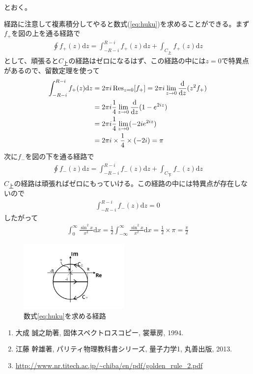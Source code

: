 \documentclass[11pt,b5paper,papersize,dvipdfmx]{jsbook}
\begin{document}
とおく。\par
経路に注意して複素積分してやると数式(\ref{eq:huku})を求めることができる。まず$f_+$を図の上を通る経路で
\begin{align}
    \oint f_+(z) \mathrm{d}z = \int^{R-i}_{-R-i} f_+(z) \mathrm{d}z + \int_{C_{上}} f_+(z) \mathrm{d}z
\end{align}
として、頑張ると$C_{上}$の経路はゼロになるはず、この経路の中には$z = 0$で特異点があるので、留数定理を使って
\begin{align}
    \int^{R-i}_{-R-i} f_+(z) \mathrm{d}z
    &= 2\pi i \operatorname{Res}_{z=0}[f_+] = 2\pi i \lim_{z \to 0}\frac{\mathrm{d}}{\mathrm{d}z}(z^2f_+) \nonumber\\
    &= 2\pi i \frac{1}{4}\lim_{z \to 0}\frac{\mathrm{d}}{\mathrm{d}z}(1-e^{2iz})\nonumber\\
    &= 2\pi i \frac{1}{4}\lim_{z \to 0}(-2ie^{2iz})\nonumber\\
    &= 2\pi i \times \frac{1}{4} \times (-2i) = \pi\nonumber
\end{align}
次に$f_-$を図の下を通る経路で
\begin{align*}
    \oint f_-(z) \mathrm{d}z = \int^{R-i}_{-R-i} f_-(z) \mathrm{d}z + \int_{C_{下}} f_-(z) \mathrm{d}z
\end{align*}
$C_{上}$の経路は頑張ればゼロにもっていける。この経路の中には特異点が存在しないので
\begin{align}
    \int^{R-i}_{-R-i} f_-(z) \mathrm{d}z = 0
\end{align}
したがって
\begin{align}
    \int^\infty_0 \frac{\sin^2 x}{x^2}\mathrm{d}x
    = \frac{1}{2}\int^\infty_{-\infty} \frac{\sin^2 x}{x^2}\mathrm{d}x
    = \frac{1}{2} \times \pi
    = \frac{\pi}{2}
\end{align}
\begin{figure}[H]
    \centering
    \includegraphics[height=3.5cm]{kadono2/img/hukuso2.pdf}
    \caption{数式\ref{eq:huku}を求める経路}
    \label{fig:maru}
\end{figure}
\vspace{-2zw}

\sanko
\begin{enumerate}
\item 大成 誠之助著, 固体スペクトロスコピー, 裳華房, 1994.
\item 江藤 幹雄著, パリティ物理教科書シリーズ, 量子力学1, 丸善出版, 2013.
\item \url{http://www.nr.titech.ac.jp/~chiba/en/pdf/golden_rule_2.pdf}
\end{enumerate}
\end{document}
